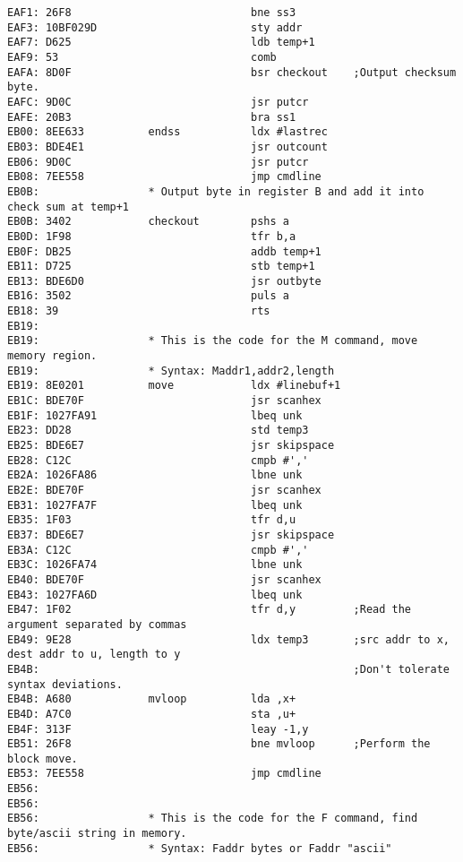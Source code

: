 {\begin{verbatim}
EAF1: 26F8                            bne ss3
EAF3: 10BF029D                        sty addr
EAF7: D625                            ldb temp+1
EAF9: 53                              comb
EAFA: 8D0F                            bsr checkout    ;Output checksum byte.
EAFC: 9D0C                            jsr putcr
EAFE: 20B3                            bra ss1
EB00: 8EE633          endss           ldx #lastrec
EB03: BDE4E1                          jsr outcount
EB06: 9D0C                            jsr putcr
EB08: 7EE558                          jmp cmdline
EB0B:                 * Output byte in register B and add it into check sum at temp+1
EB0B: 3402            checkout        pshs a
EB0D: 1F98                            tfr b,a
EB0F: DB25                            addb temp+1
EB11: D725                            stb temp+1
EB13: BDE6D0                          jsr outbyte
EB16: 3502                            puls a
EB18: 39                              rts
EB19:                 
EB19:                 * This is the code for the M command, move memory region.
EB19:                 * Syntax: Maddr1,addr2,length
EB19: 8E0201          move            ldx #linebuf+1
EB1C: BDE70F                          jsr scanhex
EB1F: 1027FA91                        lbeq unk
EB23: DD28                            std temp3
EB25: BDE6E7                          jsr skipspace
EB28: C12C                            cmpb #','
EB2A: 1026FA86                        lbne unk
EB2E: BDE70F                          jsr scanhex
EB31: 1027FA7F                        lbeq unk
EB35: 1F03                            tfr d,u
EB37: BDE6E7                          jsr skipspace
EB3A: C12C                            cmpb #','
EB3C: 1026FA74                        lbne unk
EB40: BDE70F                          jsr scanhex
EB43: 1027FA6D                        lbeq unk
EB47: 1F02                            tfr d,y         ;Read the argument separated by commas
EB49: 9E28                            ldx temp3       ;src addr to x, dest addr to u, length to y
EB4B:                                                 ;Don't tolerate syntax deviations.
EB4B: A680            mvloop          lda ,x+
EB4D: A7C0                            sta ,u+
EB4F: 313F                            leay -1,y
EB51: 26F8                            bne mvloop      ;Perform the block move.
EB53: 7EE558                          jmp cmdline
EB56:                                 
EB56:                 
EB56:                 * This is the code for the F command, find byte/ascii string in memory.
EB56:                 * Syntax: Faddr bytes or Faddr "ascii"

\end{verbatim}}
